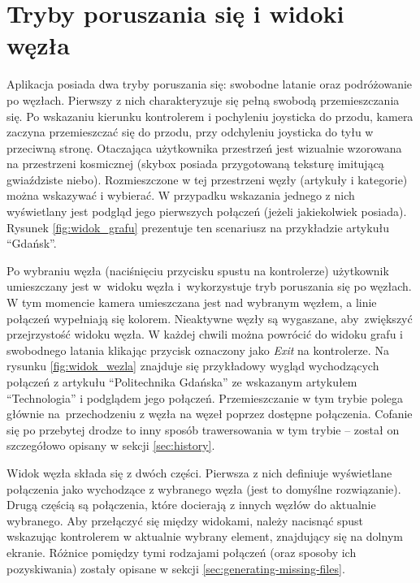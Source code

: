 \section{Tryby poruszania się i widoki węzła}
\label{sec:tryby-widoki}
Aplikacja posiada dwa tryby poruszania się: swobodne latanie oraz podróżowanie po węzłach. Pierwszy z nich charakteryzuje się pełną swobodą przemieszczania się. Po wskazaniu kierunku kontrolerem i pochyleniu joysticka do przodu, kamera zaczyna przemieszczać się do przodu, przy odchyleniu joysticka do tyłu w przeciwną stronę. Otaczająca użytkownika przestrzeń jest wizualnie wzorowana na przestrzeni kosmicznej (skybox posiada przygotowaną teksturę imitującą gwiaździste niebo). Rozmieszczone w tej przestrzeni węzły (artykuły i kategorie) można wskazywać i wybierać. W przypadku wskazania jednego z nich wyświetlany jest podgląd jego pierwszych połączeń (jeżeli jakiekolwiek posiada). Rysunek \ref{fig:widok_grafu} prezentuje ten scenariusz na przykładzie artykułu ``Gdańsk''.


Po wybraniu węzła (naciśnięciu przycisku spustu na kontrolerze) użytkownik umieszczany jest w~widoku węzła i~wykorzystuje tryb poruszania się po węzłach. W tym momencie kamera umieszczana jest nad wybranym węzłem, a linie połączeń wypełniają się kolorem. Nieaktywne węzły są wygaszane, aby~zwiększyć przejrzystość widoku węzła. W każdej chwili można powrócić do widoku grafu i swobodnego latania klikając przycisk oznaczony jako \textit{Exit} na kontrolerze. Na rysunku \ref{fig:widok_wezla} znajduje się przykładowy wygląd wychodzących połączeń z artykułu ``Politechnika Gdańska'' ze wskazanym artykułem ``Technologia'' i podglądem jego połączeń. Przemieszczanie w tym trybie polega głównie na~przechodzeniu z węzła na węzeł poprzez dostępne połączenia. Cofanie się po przebytej drodze to inny sposób trawersowania w tym trybie – został on szczegółowo opisany w sekcji \ref{sec:history}.


Widok węzła składa się z dwóch części. Pierwsza z nich definiuje wyświetlane połączenia jako wychodzące z wybranego węzła (jest to domyślne rozwiązanie). Drugą częścią są połączenia, które docierają z innych węzłów do aktualnie wybranego. Aby przełączyć się między widokami, należy nacisnąć spust wskazując kontrolerem w aktualnie wybrany element, znajdujący się na dolnym ekranie. Różnice pomiędzy tymi rodzajami połączeń (oraz sposoby ich pozyskiwania) zostały opisane w sekcji \ref{sec:generating-missing-files}.